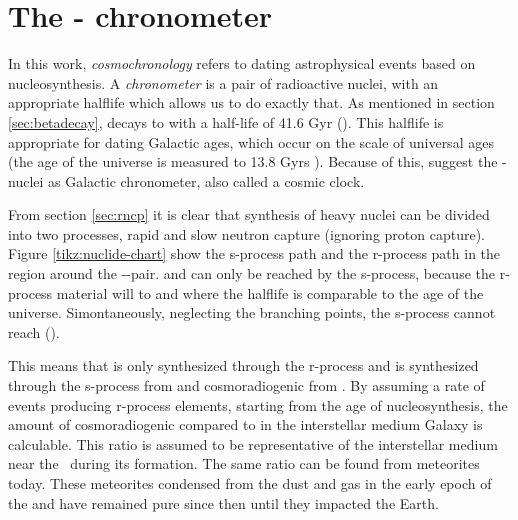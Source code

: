 \pagebreak
\section{The - chronometer}
\nopagebreak
\begin{figure}[h]
  
\end{figure}
\FloatBarrier

In this work, \textit{cosmochronology} refers to dating astrophysical events based on nucleosynthesis.
A \textit{chronometer} is a pair of radioactive nuclei, with an appropriate halflife which allows us to do exactly that.
As mentioned in section \ref{sec:betadecay},  decays to  with a half-life of 41.6 Gyr ().
This halflife is appropriate for dating Galactic ages, which occur on the scale of universal ages (the age of the universe is measured to 13.8 Gyrs ).
Because of this,  suggest the - nuclei as Galactic chronometer, also called a cosmic clock.

From section \ref{sec:rncp} it is clear that synthesis of heavy nuclei can be divided into two processes, rapid and slow neutron capture (ignoring proton capture).
Figure \ref{tikz:nuclide-chart} show the s-process path and the r-process path in the region around the --pair.
 and  can only be reached by the s-process, because the r-process material will \betadecay to  and  where the halflife is comparable to the age of the universe. Simontaneously, neglecting the  branching points, the s-process cannot reach  ().

This means that  is only synthesized through the r-process and  is synthesized through the s-process from  and cosmoradiogenic \betadecay from .
By assuming a rate of events producing r-process elements, starting from the age of nucleosynthesis, the amount of cosmoradiogenic  compared to  in the interstellar medium Galaxy is calculable.
This ratio is assumed to be representative of the interstellar medium near the \sos\ during its formation.
The same ratio can be found from meteorites today. These meteorites condensed from the dust and gas in the early epoch of the \sos and have remained pure since then until they impacted the Earth.

